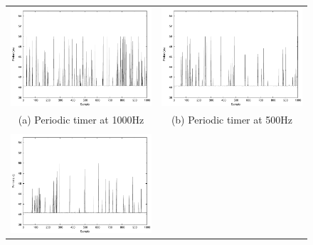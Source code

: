\documentclass[final,3pd,times]{elsarticle}
\begin{document}
\begin{figure}[h!]
\centering
\begin{tabular}{cc}
\includegraphics[scale=0.48]{interference_periodic_1000hz} &
\includegraphics[scale=0.48]{interference_periodic_500hz}\\
(a) Periodic timer at 1000Hz & (b) Periodic timer at 500Hz\\
\\
\includegraphics[scale=0.48]{interference_periodic_50hz} &

\end{tabular}
\end{figure}
\end{document}
